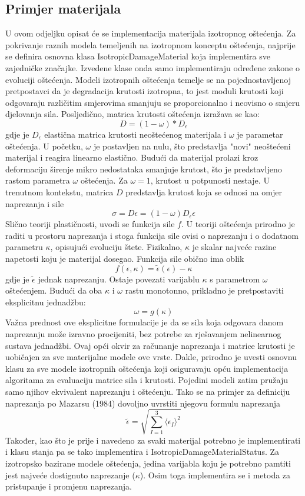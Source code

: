 \documentclass[a4paper,twoside,12pt]{memoir} %
\begin{document}
\subsection{Primjer materijala}
U ovom odjeljku opisat će se implementacija materijala izotropnog oštećenja. Za pokrivanje raznih modela temeljenih na izotropnom konceptu oštećenja, najprije se definira osnovna klasa IsotropicDamageMaterial koja implementira sve zajedničke značajke. Izvedene klase onda samo implementiraju određene zakone o evoluciji oštećenja.
Modeli izotropnih oštećenja temelje se na pojednostavljenoj pretpostavci da je degradacija krutosti izotropna, to jest moduli krutosti koji odgovaraju različitim smjerovima smanjuju se proporcionalno i neovisno o smjeru djelovanja sila. Posljedično, matrica krutosti oštećenja izražava se kao:
$$ D = (1 - \omega) * D_\epsilon$$
gdje je $D_\epsilon$ elastična matrica krutosti neoštećenog materijala i $\omega$ je parametar oštećenja. U početku, $\omega$ je postavljen na nulu, što predstavlja "novi" neoštećeni materijal i reagira linearno elastično. Budući da materijal prolazi kroz deformaciju širenje mikro nedostataka smanjuje krutost, što je predstavljeno rastom parametra $\omega$ oštećenja. Za $\omega = 1$, krutost u potpunosti nestaje. U trenutnom kontekstu, matrica $D$ predstavlja krutost koja se odnosi na omjer naprezanja i sile
$$\sigma = D \epsilon = (1 - \omega) D_\epsilon \epsilon$$
Slično teoriji plastičnosti, uvodi se funkcija sile $f$. U teoriji oštećenja prirodno je raditi u prostoru naprezanja i stoga funkcija sile ovisi o naprezanju i o dodatnom parametru $\kappa$, opisujući evoluciju štete. Fizikalno, $\kappa$ je skalar najveće razine napetosti koju je materijal dosegao. Funkcija sile obično ima oblik 
$$f(\epsilon, \kappa) = \widetilde{\epsilon} (\epsilon) - \kappa$$
gdje je $\widetilde{\epsilon}$ jednak naprezanju. Ostaje povezati varijablu $\kappa$ s parametrom $\omega$ oštećenjem. Budući da oba $\kappa$ i $\omega$ rastu monotonno, prikladno je pretpostaviti eksplicitnu jednadžbu:
$$ \omega = g(\kappa) $$
Važna prednost ove eksplicitne formulacije je da se sila koja odgovara danom naprezanju može izravno procijeniti, bez potrebe za rješavanjem nelinearnog sustava jednadžbi.
Ovaj opći okvir za računanje naprezanja i matrice krutosti je uobičajen za sve materijalne modele ove vrste. Dakle, prirodno je uvesti osnovnu klasu za sve modele izotropnih oštećenja koji osiguravaju opću implementacija algoritama za evaluaciju matrice sila i krutosti. Pojedini modeli zatim pružaju samo njihov ekvivalent naprezanju i oštećenju. Tako se na primjer za definiciju naprezanja po Mazarsu (1984) dovoljno uvrstiti njegovu formulu naprezanja
$$ \widetilde{\epsilon} = \sqrt{\sum^3_{I=1} \langle \epsilon_I \rangle^2 }$$
Također, kao što je prije i navedeno za svaki materijal potrebno je implementirati i klasu stanja pa se tako implementira i IsotropicDamageMaterialStatus. Za izotropsko bazirane modele oštećenja, jedina varijabla koju je potrebno pamtiti jest najveće dostignuto naprezanje ($\kappa$). Osim toga implementira se i metoda za pristupanje i promjenu naprezanja.
\end{document}
